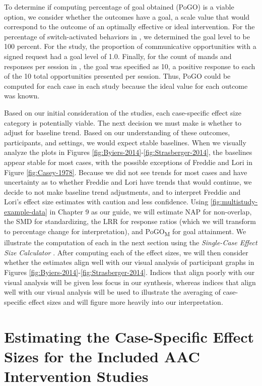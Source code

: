 \documentclass[
]{book}
\begin{document}
To determine if computing percentage of goal obtained (PoGO) is a viable option, we consider whether the outcomes have a goal, a scale value that would correspond to the outcome of an optimally effective or ideal intervention. For the percentage of switch-activated behaviors in \citet{Byiers2014}, we determined the goal level to be 100 percent. For the \citet{Casey1978} study, the proportion of communicative opportunities with a signed request had a goal level of 1.0. Finally, for the count of mands and responses per session in \citet{StrasbergerFerreri2014}, the goal was specified as 10, a positive response to each of the 10 total opportunities presented per session. Thus, PoGO could be computed for each case in each study because the ideal value for each outcome was known.

Based on our initial consideration of the studies, each case-specific effect size category is potentially viable. The next decision we must make is whether to adjust for baseline trend. Based on our understanding of these outcomes, participants, and settings, we would expect stable baselines. When we visually analyze the plots in Figures \ref{fig:Byiers-2014}-\ref{fig:Strasberger-2014}, the baselines appear stable for most cases, with the possible exceptions of Freddie and Lori in Figure \ref{fig:Casey-1978}. Because we did not see trends for most cases and have uncertainty as to whether Freddie and Lori have trends that would continue, we decide to not make baseline trend adjustments, and to interpret Freddie and Lori's effect size estimates with caution and less confidence. Using \ref{fig:multistudy-example-data} in Chapter 9 as our guide, we will estimate NAP for non-overlap, the SMD for standardizing, the LRR for response ratios (which we will transform to percentage change for interpretation), and PoGO\textsubscript{M} for goal attainment. We illustrate the computation of each in the next section using the \emph{Single-Case Effect Size Calculator} \citep{pustejovsky2023SingleCaseES}. After computing each of the effect sizes, we will then consider whether the estimates align well with our visual analysis of participant graphs in Figures \ref{fig:Byiers-2014}-\ref{fig:Strasberger-2014}. Indices that align poorly with our visual analysis will be given less focus in our synthesis, whereas indices that align well with our visual analysis will be used to illustrate the averaging of case-specific effect sizes and will figure more heavily into our interpretation.

\hypertarget{estimating-the-case-specific-effect-sizes-for-the-included-aac-intervention-studies}{%
\section{Estimating the Case-Specific Effect Sizes for the Included AAC Intervention Studies}\label{estimating-the-case-specific-effect-sizes-for-the-included-aac-intervention-studies}}
\end{document}
